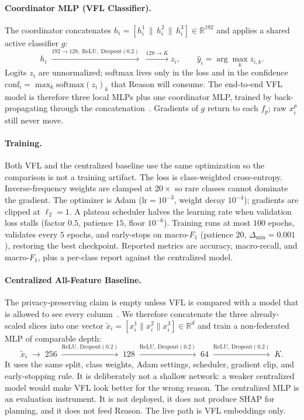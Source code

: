 \paragraph{Coordinator MLP (VFL Classifier).}
The coordinator concatenates $h_i=[h_i^1\,\|\,h_i^2\,\|\,h_i^3]\in\mathbb{R}^{192}$ and applies a shared active classifier $g$:
\begin{equation}
h_i
\;\xrightarrow{192\rightarrow 128,\;\mathrm{ReLU},\;\mathrm{Dropout}(0.2)}
\;\xrightarrow{128\rightarrow K}
z_i,\qquad
\hat{y}_i=\arg\max_k z_{i,k}.
\end{equation}
Logits $z_i$ are unnormalized; softmax lives only in the loss and in the confidence $\mathrm{conf}_i=\max_k\mathrm{softmax}(z_i)_k$ that Reason will consume. The end-to-end VFL model is therefore three local MLPs plus one coordinator MLP, trained by back-propagating through the concatenation~\cite{liu2024vfl}. Gradients of $g$ return to each $f_p$; raw $x_i^p$ still never move.

\paragraph{Training.}
Both VFL and the centralized baseline use the same optimization so the comparison is not a training artifact. The loss is class-weighted cross-entropy. Inverse-frequency weights are clamped at $20\times$ so rare classes cannot dominate the gradient. The optimizer is Adam ($\mathrm{lr}=10^{-3}$, weight decay $10^{-4}$); gradients are clipped at $\ell_2=1$. A plateau scheduler halves the learning rate when validation loss stalls (factor $0.5$, patience $15$, floor $10^{-6}$). Training runs at most $100$ epochs, validates every $5$ epochs, and early-stops on macro-$F_1$ (patience $20$, $\Delta_{\min}=0.001$), restoring the best checkpoint. Reported metrics are accuracy, macro-recall, and macro-$F_1$, plus a per-class report against the centralized model.

\paragraph{Centralized All-Feature Baseline.}
The privacy-preserving claim is empty unless VFL is compared with a model that is allowed to see every column~\cite{ye2024vfl,yu2024vflprivacy}. We therefore concatenate the three already-scaled slices into one vector $\tilde{x}_i=[x_i^1\|x_i^2\|x_i^3]\in\mathbb{R}^{d}$ and train a non-federated MLP of comparable depth:
\begin{equation}
\tilde{x}_i
\;\rightarrow\; 256 \;\xrightarrow{\mathrm{ReLU},\,\mathrm{Dropout}(0.2)}\;
128 \;\xrightarrow{\mathrm{ReLU},\,\mathrm{Dropout}(0.2)}\;
64 \;\xrightarrow{\mathrm{ReLU},\,\mathrm{Dropout}(0.2)}\; K.
\end{equation}
It uses the same split, class weights, Adam settings, scheduler, gradient clip, and early-stopping rule. It is deliberately not a shallow network: a weaker centralized model would make VFL look better for the wrong reason. The centralized MLP is an evaluation instrument. It is not deployed, it does not produce SHAP for planning, and it does not feed Reason. The live path is VFL embeddings only.

